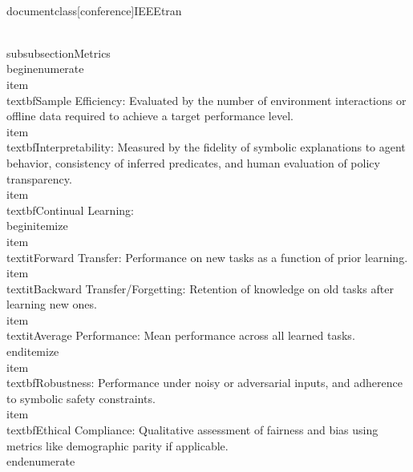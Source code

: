 \\documentclass[conference]{IEEEtran}
\begin{document}
\\subsubsection{Metrics}
\\begin{enumerate}
    \\item \\textbf{Sample Efficiency}: Evaluated by the number of environment interactions or offline data required to achieve a target performance level.
    \\item \\textbf{Interpretability}: Measured by the fidelity of symbolic explanations to agent behavior, consistency of inferred predicates, and human evaluation of policy transparency.
    \\item \\textbf{Continual Learning}:
    \\begin{itemize}
        \\item \\textit{Forward Transfer}: Performance on new tasks as a function of prior learning.
        \\item \\textit{Backward Transfer/Forgetting}: Retention of knowledge on old tasks after learning new ones.
        \\item \\textit{Average Performance}: Mean performance across all learned tasks.
    \\end{itemize}
    \\item \\textbf{Robustness}: Performance under noisy or adversarial inputs, and adherence to symbolic safety constraints.
    \\item \\textbf{Ethical Compliance}: Qualitative assessment of fairness and bias using metrics like demographic parity if applicable.
\\end{enumerate}
\end{document}
